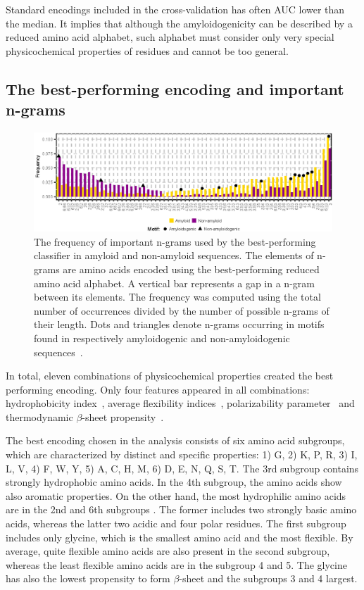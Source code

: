 \documentclass[fleqn,10pt,twoside]{gcb15submission}
\begin{document}
  Standard encodings included in the cross-validation has often AUC lower than 
the median. It implies that although the amyloidogenicity can be described by a 
reduced amino acid alphabet, such alphabet must consider only very special 
physicochemical properties of residues and cannot be too general.

\subsection{The best-performing encoding and important n-grams}


\begin{figure}[h]
\centerline{\includegraphics{figures/ngrams.eps}}
\caption{The frequency of important n-grams used by the best-performing 
classifier in amyloid and non-amyloid sequences. The elements of n-grams are 
amino acids encoded using the best-performing reduced amino acid alphabet. A 
vertical bar represents a gap in a n-gram between its elements. The frequency 
was computed using the total number of occurrences divided by the number of 
possible n-grams of their length. Dots and triangles denote n-grams occurring in 
motifs found in respectively amyloidogenic and non-amyloidogenic 
sequences~\citep{lopez_de_la_paz_sequence_2004}.}\label{fig:ngrams} 
\end{figure}

In total, eleven combinations of physicochemical properties created the best 
performing encoding. Only four features appeared in all combinations: 
hydrophobicity index~\citep{argos_structural_1982}, average flexibility 
indices~\citep{bhaskaran_positional_1988}, polarizability 
parameter~\citep{charton_structural_1982} and thermodynamic $\beta$-sheet 
propensity~\citep{kim_thermodynamic_1993}.

  The best encoding chosen in the analysis consists of six amino acid subgroups, 
which are characterized by distinct and specific properties: 1) G, 2) K, P, R, 
3) I, L, V, 4) F, W, Y, 5) A, C, H, M, 6) D, E, N, Q, S, T. The 3rd subgroup 
contains strongly hydrophobic amino acids. In the 4th subgroup, the amino acids 
show also aromatic properties. On the other hand, the most hydrophilic amino 
acids are in the 2nd and 6th subgroups . The former includes two strongly basic 
amino acids, whereas the latter two acidic and four polar residues. The first 
subgroup includes only glycine, which is the smallest amino acid and the most 
flexible. By average, quite flexible amino acids are also present in the second 
subgroup, whereas the least flexible amino acids are in the subgroup 4 and 5. 
The glycine has also the lowest propensity to form $\beta$-sheet and the 
subgroups 3 and 4 largest. 
\end{document}
